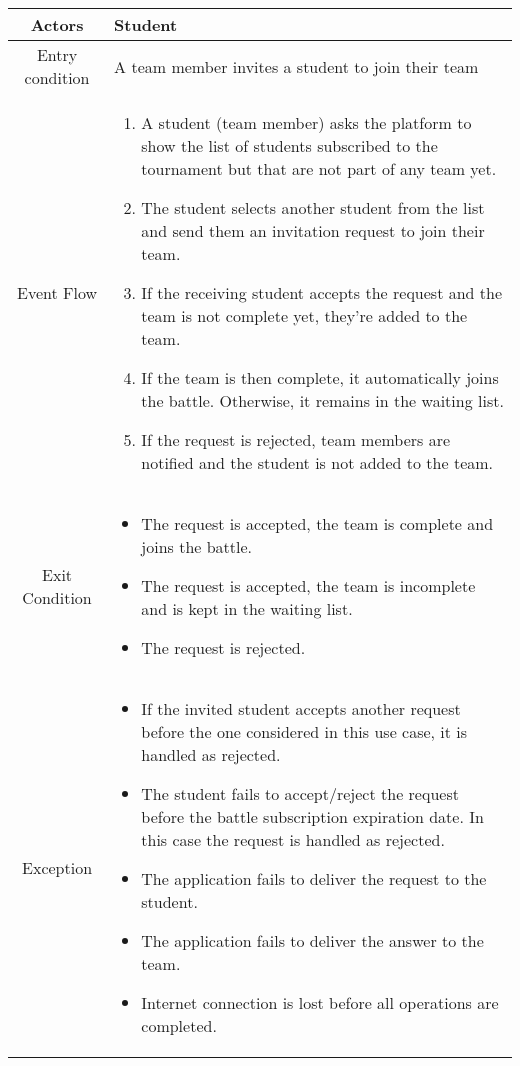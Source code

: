 \documentclass[a4paper, 11pt, titlepage]{article}
\begin{document}
\begin{center}
    \begin{tabularx}{\linewidth} {|c|X|}
        \hline 
        Actors & Student\\
        \hline 
        Entry condition & A team member invites a student to join their team\\
        \hline 
        Event Flow &
        \begin{enumerate}
            \item A student (team member) asks the platform to show the list of students
             subscribed to the tournament but that are not part of any team yet.
             \item The student selects another student from the list and send them an invitation request to join their team.
             \item If the receiving student accepts the request and the team is not complete yet, they're added to the team.
             \item If the team is then complete, it automatically joins the battle. Otherwise, it remains in the waiting list.
             \item If the request is rejected, team members are notified and the student is not added to the team. 
        \end{enumerate}\\
        \hline 
        Exit Condition &
        \begin{itemize}
            \item The request is accepted, the team is complete and joins the battle.
            \item The request is accepted, the team is incomplete and is kept in the waiting list.
            \item The request is rejected.
        \end{itemize}\\
        \hline 
        Exception & 
        \begin{itemize}
            \item If the invited student accepts another request before the one considered in this use case, it is handled as rejected.
            \item The student fails to accept/reject the request before the battle subscription expiration date. In this case the request is handled as rejected.
            \item The application fails to deliver the request to the student.
            \item The application fails to deliver the answer to the team.
            \item Internet connection is lost before all operations are completed.
        \end{itemize}\\
        \hline
    \end{tabularx}
\end{center}
\end{document}

